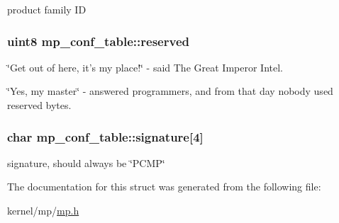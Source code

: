 \label{structmp__conf__table_afdc8029c16e64c7da8ce4b85366118ef}
product family ID \hypertarget{structmp__conf__table_aa21f98f682bd9a35612d18e279cb223c}{
\subsubsection[{reserved}]{\setlength{\rightskip}{0pt plus 5cm}uint8 {\bf mp\_\-conf\_\-table::reserved}}}
\label{structmp__conf__table_aa21f98f682bd9a35612d18e279cb223c}
\char`\"{}Get out of here, it's my place!\char`\"{} -\/ said The Great Imperor Intel.

\char`\"{}Yes, my master\char`\"{} -\/ answered programmers, and from that day nobody used reserved bytes. \hypertarget{structmp__conf__table_a6469f637456706ffec8a34d237d83be9}{
\subsubsection[{signature}]{\setlength{\rightskip}{0pt plus 5cm}char {\bf mp\_\-conf\_\-table::signature}\mbox{[}4\mbox{]}}}
\label{structmp__conf__table_a6469f637456706ffec8a34d237d83be9}
signature, should always be \char`\"{}PCMP\char`\"{} 

The documentation for this struct was generated from the following file:\begin{DoxyCompactItemize}
\item 
kernel/mp/\hyperlink{mp_8h}{mp.h}\end{DoxyCompactItemize}
